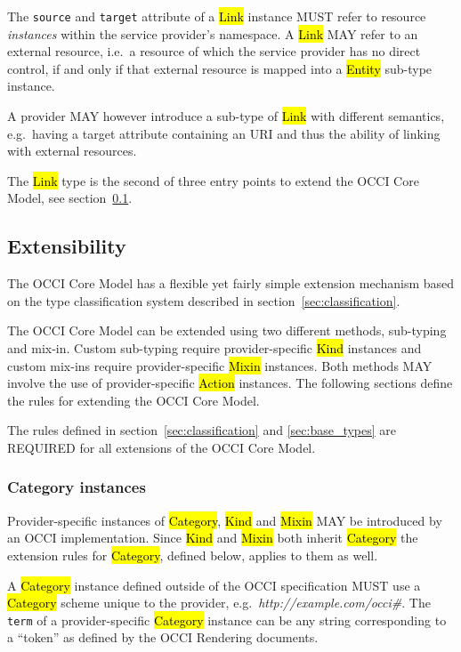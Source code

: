 \documentclass[10pt,a4paper]{article}
\begin{document}
The {\tt source} and {\tt target} attribute of a \hl{Link} instance
MUST refer to resource {\em instances} within the service provider's
namespace. A \hl{Link} MAY refer to an external resource, i.e.~a
resource of which the service provider has no direct control, if and
only if that external resource is mapped into a \hl{Entity} sub-type
instance.

A provider MAY however introduce a sub-type of \hl{Link} with
different semantics, e.g.~having a target attribute containing an URI
and thus the ability of linking with external resources.

The \hl{Link} type is the second of three entry points to extend the
OCCI Core Model, see section~\ref{sec:extensibility}.


\subsection{Extensibility}
\label{sec:extensibility}
The OCCI Core Model has a flexible yet fairly simple extension
mechanism based on the type classification system described in
section~\ref{sec:classification}.

The OCCI Core Model can be extended using two different methods,
sub-typing and mix-in. Custom sub-typing require provider-specific
\hl{Kind} instances and custom mix-ins require provider-specific
\hl{Mixin} instances.  Both methods MAY involve the use of
provider-specific \hl{Action} instances.
The following sections
define the rules for extending the OCCI Core Model.

The rules defined in section~\ref{sec:classification} and
\ref{sec:base_types} are REQUIRED for all extensions of the OCCI Core
Model.

\subsubsection{Category instances}
\label{sec:ext:category}
Provider-specific instances of \hl{Category}, \hl{Kind} and \hl{Mixin}
MAY be introduced by an OCCI implementation. Since \hl{Kind} and
\hl{Mixin} both inherit \hl{Category} the extension rules for
\hl{Category}, defined below, applies to them as well.

A \hl{Category} instance defined outside of the OCCI specification
MUST use a \hl{Category} scheme unique to the provider,
e.g.~\textit{http://example.com/occi\#}. The {\tt term} of a
provider-specific \hl{Category} instance can be any string
corresponding to a ``token'' as defined by the OCCI Rendering documents.
\end{document}
